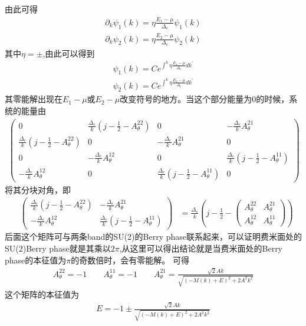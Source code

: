 \documentclass[22pt]{article}
\begin{document}
由此可得
\begin{align}
	\partial_k\psi_1(k)=\eta\frac{E_1-\mu}{\Delta_e}\psi_1(k)\\
	\partial_k\psi_2(k)=\eta\frac{E_2-\mu}{\Delta_e}\psi_2(k)
\end{align}
其中$\eta=\pm$,由此可以得到
\begin{align}
	\psi_1(k)=Ce^{\int^k\eta\frac{E_1-\mu}{\Delta_e}dk^{'}}\\
	\psi_2(k)=Ce^{\int^k\eta\frac{E_2-\mu}{\Delta_e}dk^{'}}
\end{align}
其零能解出现在$E_1-\mu$或$E_2-\mu$改变符号的地方。当这个部分能量为0的时候，系统的能量由
\begin{align}
	\begin{pmatrix}
	  	0&\frac{\Delta_e}{k}(j-\frac{1}{2}-A_{\theta}^{22})&0&-\frac{\Delta_e}{k}A_{\theta}^{21}\\
	  	\frac{\Delta_e}{k}(j-\frac{1}{2}-A_{\theta}^{22})&0&-\frac{\Delta_e}{k}A_{\theta}^{21}&0\\
	  	0&-\frac{\Delta_e}{k}A_{\theta}^{12}&0&\frac{\Delta_e}{k}(j-\frac{1}{2}-A_{\theta}^{11})\\
	  	-\frac{\Delta_e}{k}A_{\theta}^{12}&0&\frac{\Delta_e}{k}(j-\frac{1}{2}-A_{\theta}^{11})&0
	\end{pmatrix}
\end{align}
	将其分块对角，即
	\begin{align}
		&
		\begin{pmatrix}
			\frac{\Delta_e}{k}(j-\frac{1}{2}-A_{\theta}^{22})&-\frac{\Delta_e}{k}A_{\theta}^{21}\\
			-\frac{\Delta_e}{k}A_{\theta}^{12}&\frac{\Delta_e}{k}(j-\frac{1}{2}-A_{\theta}^{11})
		\end{pmatrix}
	&=\frac{\Delta_e}{k}(j-\frac{1}{2}-
	\begin{pmatrix}
		A_{\theta}^{22} &A_{\theta}^{21}\\
		A_{\theta}^{12}&A_{\theta}^{11}
	\end{pmatrix})
	\end{align}
后面这个矩阵可与两条band的SU(2)的Berry phase联系起来，可以证明费米面处的SU(2)Berry phase就是其乘以$2\pi$,从这里可以得出结论就是当费米面处的Berry phase的本征值为$\pi$的奇数倍时，会有零能解。
	可得
	\begin{align}
		A_{\theta}^{22}=-1 \qquad A_{\theta}^{11}=-1 \qquad
		A_{\theta}^{21}=\frac{\sqrt{2}Ak}{\sqrt{(-M(k)+E)^2+2A^2k^2}}
	\end{align}
这个矩阵的本征值为
\begin{align}
	E=-1\pm\frac{\sqrt{2}Ak}{\sqrt{(-M(k)+E)^2+2A^2k^2}}
\end{align}
\end{document}

